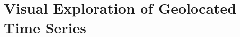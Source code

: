 
\chapter{Visual Exploration of Geolocated Time Series}\label{chap:vis}

\graphicspath{{ElsevierBigDataResearch/}}






